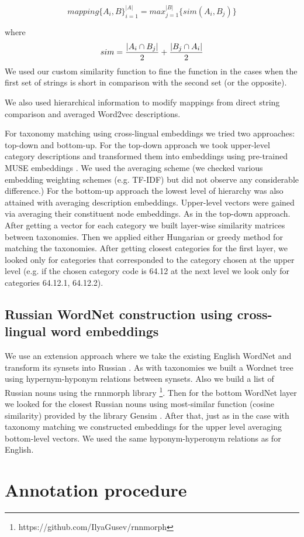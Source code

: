 \documentclass[11pt,a4paper]{article}
\begin{document}
$$mapping\{A_i, B\}_{i=1}^{|A|} = max_{j=1}^{|B|}\{sim(A_i,B_j)\}$$

where $$sim = \dfrac{|A_i \cap B_j|}{2} + \\ \dfrac{|B_j \cap A_i|}{2} $$
We used our custom similarity function to fine the function in the cases when the first set of strings is short in comparison with the second set (or the opposite).

We also used hierarchical information to modify mappings from direct string comparison and averaged Word2vec descriptions.

For taxonomy matching using cross-lingual embeddings we tried two approaches: top-down and bottom-up. For the top-down approach we took upper-level category descriptions and transformed them into embeddings using pre-trained MUSE embeddings \cite{muse}. We used the averaging scheme (we checked various embedding weighting schemes (e.g. TF-IDF) but did not observe any considerable difference.)
For the bottom-up approach the lowest level of hierarchy was also attained with averaging description embeddings. Upper-level vectors were gained via averaging their constituent node embeddings. As in the top-down approach.
After getting a vector for each category we built layer-wise similarity matrices between taxonomies. Then we applied either Hungarian or greedy method for matching the taxonomies. After getting closest categories for the first layer, we looked only for categories that corresponded to the category chosen at the upper level (e.g. if the chosen category code is 64.12 at the next level we look only for categories 64.12.1, 64.12.2).
\subsection{Russian WordNet construction using cross-lingual word embeddings}
We use an extension approach where we take the existing English WordNet and transform its synsets into Russian \cite{NEALE18.1030}. As with taxonomies we built a Wordnet tree using hypernym-hyponym relations between synsets. Also we build a list of Russian nouns using the rnnmorph library \footnote{https://github.com/IlyaGusev/rnnmorph}. Then for the bottom WordNet layer we looked for the closest Russian nouns using most-similar function (cosine similarity) provided by the library Gensim \cite{gensim}. After that, just as in the case with taxonomy matching we constructed embeddings for the upper level averaging bottom-level vectors. We used the same hyponym-hyperonym relations as for English.
\section{Annotation procedure}
\end{document}
